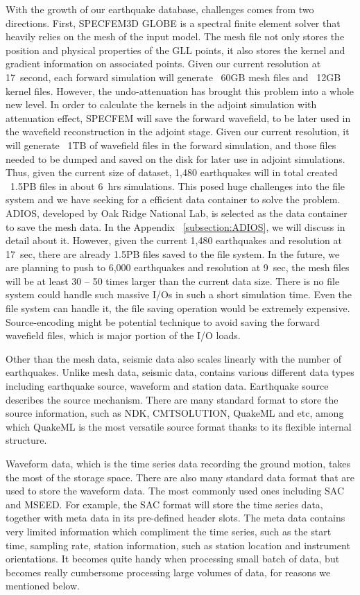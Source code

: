 With the growth of our earthquake database, challenges comes from two directions.
First, SPECFEM3D GLOBE is a spectral finite element solver that heavily
relies on the mesh of the input model.
The mesh file not only stores
the position and physical properties of the GLL points, it also stores
the kernel and gradient information on associated points. Given our current
resolution at 17~second, each forward simulation will generate ~60GB mesh
files and ~12GB kernel files. However, the undo-attenuation has brought this
problem into a whole new level. In order to calculate the kernels in the adjoint
simulation with attenuation effect, SPECFEM will save the forward wavefield,
to be later used in the wavefield reconstruction in the adjoint stage.
Given our current resolution,
it will generate ~1TB of wavefield files in the forward simulation, and those
files needed to be dumped and saved on the disk for later use in adjoint simulations.
Thus, given the current size of dataset,
1,480 earthquakes will in total created ~1.5PB files in about 6~hrs simulations.
This posed huge challenges into the file system and we have seeking for
a efficient data container to solve the problem. ADIOS, developed by Oak Ridge
National Lab, is selected as the data container to save the mesh data.
In the Appendix ~\ref{subsection:ADIOS}, we will discuss in detail about it.
However, given the current 1,480 earthquakes and resolution at 17~sec,
there are already 1.5PB files saved to the file system. In the future, we are
planning to push to 6,000 earthquakes and resolution at 9~sec, the mesh files
will be at least 30 -- 50 times larger than the current data size. There is no file
system could handle such massive I/Os in such a short simulation time. Even
the file system can handle it, the file saving operation would be extremely 
expensive. Source-encoding might be potential technique to avoid saving the forward
wavefield files, which is major portion of the I/O loads.

Other than the mesh data, seismic data also scales linearly with the number
of earthquakes. Unlike mesh data, seismic data, contains various different
data types including earthquake source, waveform and station data.
Earthquake source describes the source mechanism. There are many standard
format to store the source information, such as NDK, CMTSOLUTION, QuakeML and etc,
among which QuakeML is the most versatile source format thanks to its flexible
internal structure.

Waveform data, which is the time series data recording the ground motion, takes
the most of the storage space.
There are also many standard data format that are used to store the waveform
data. The most commonly used ones including SAC and MSEED. For example, the SAC format
will store the time series data, together with meta data
in its pre-defined header slots. The meta data contains very limited information
which compliment the time series, such as the start time, sampling rate, station
information, such as station location and instrument orientations. It becomes quite
handy when processing small batch of data, but becomes really cumbersome processing
large volumes of data, for reasons we mentioned below.

